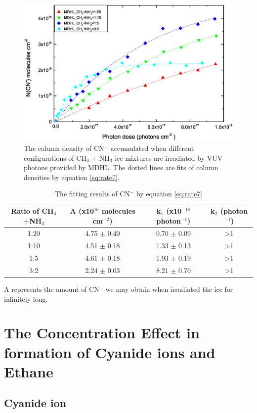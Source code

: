 \begin{figure}
\centering
\includegraphics[width=\textwidth]{figures/chapter3/Overall_CN_rate.eps}
\caption{The column density of CN$^-$ accumulated when different configurations of CH$_4$ + NH$_3$ ice mixtures are irradiated by VUV photons provided by MDHL. The dotted lines are fits of column densities by equation \ref{eq:rate7}.}
\label{fig:CNrate}
\end{figure}

\begin{table}[htbp]
\caption{The fitting results of CN$^-$ by equation \ref{eq:rate7}}
\label{tab:CNrate}
\begin{tabular}{cccc}
\hline
\hline
Ratio of CH$_4$+NH$_3$ & A (x10$^{16}$ molecules cm$^{-2}$) & k$_1$ (x10$^{-18}$ photon$^{-1}$) & k$_2$ (photon$^{-1}$)\\
\hline
1:20 & 4.75 $\pm$ 0.40 & 0.70 $\pm$ 0.09 & >1 \\
1:10 & 4.51 $\pm$ 0.18 & 1.33 $\pm$ 0.13 & >1 \\
1:5 & 4.61 $\pm$ 0.18 & 1.93 $\pm$ 0.19 & >1 \\
3:2 & 2.24 $\pm$ 0.03 & 8.21 $\pm$ 0.70 & >1 \\
\hline
\end{tabular}
A represents the amount of CN$^-$ we may obtain when irradiated the ice for infinitely long.\
\end{table}

\section{The Concentration Effect in formation of Cyanide ions and Ethane}

\subsection{Cyanide ion}

